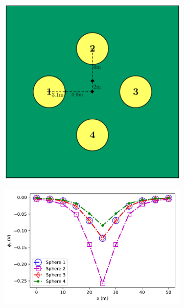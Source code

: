 \documentclass[preprint,authoryear,12pt]{elsarticle}
\begin{document}
\begin{figure}[htp]
   \begin{center}
      \begin{subfigure}{0.4\linewidth}
         \includegraphics[trim=0cm 0cm 0cm 0cm, clip=true,width=\linewidth]{./figures/Fig3a.pdf}
         \caption{}
         \label{fig:4Spheres_ZOffset_Model}
      \end{subfigure}
      \hfill
      \begin{subfigure}{0.59\linewidth}
         \includegraphics[trim=0cm 0cm 0cm 0cm, clip=true,width=\linewidth]{./figures/Fig3b.pdf}

\end{subfigure}
\end{center}
\end{figure}
\end{document}
